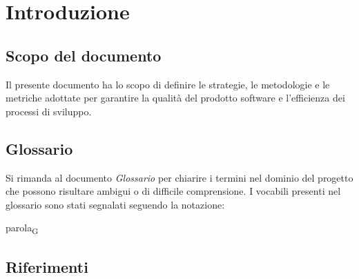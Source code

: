 \documentclass[a4paper,12pt]{article}
\begin{document}
    \listoffigures
    \newpage

    \listoftables
    \newpage
    
    \section{Introduzione} {
        \subsection{Scopo del documento}
            Il presente documento ha lo scopo di definire le strategie, le metodologie e le metriche adottate per garantire la qualità del prodotto software e l'efficienza dei processi di sviluppo.

        \subsection{Glossario}
            Si rimanda al documento \textit{Glossario} per chiarire i termini nel dominio del progetto che possono risultare ambigui o di difficile comprensione. I vocabili presenti nel glossario sono stati segnalati seguendo la notazione:
            \begin{center}
                parola\textsubscript{G}
            \end{center}
        \subsection{Riferimenti}
}
\end{document}

